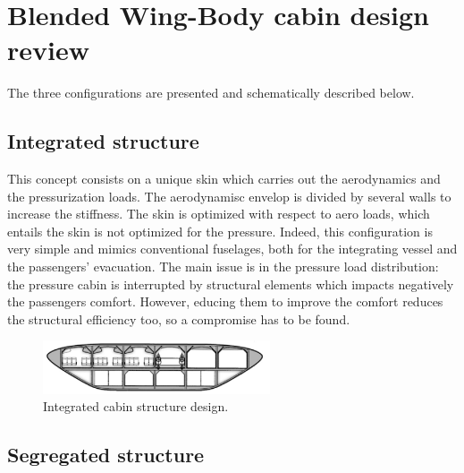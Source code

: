 \chapter{Blended Wing-Body cabin design review}
\label{app:bwb_cabin_design}

The three configurations are presented and schematically described below. 

\section{Integrated structure}
\label{sec:app1_integrated_struct}

This concept consists on a unique skin which carries out the aerodynamics and the pressurization loads. 
The aerodynamisc envelop is divided by several walls to increase the stiffness.
The skin is optimized with respect to aero loads, which entails the skin is not optimized for the pressure. 
Indeed, this configuration is very simple and mimics conventional fuselages, both for the integrating vessel and the passengers' evacuation. 
The main issue is in the pressure load distribution: the pressure cabin is interrupted by structural elements which impacts negatively the passengers comfort. 
However, educing them to improve the comfort reduces the structural efficiency too, so a compromise has to be found.
\begin{figure}[h!]
	\centering
	\includegraphics[keepaspectratio, width=0.6\textwidth]{images/app_bwb_cab/integrated_structure.jpg}
	\caption{Integrated cabin structure design.}
	\label{fig:bwb_integrated}
\end{figure}

\section{Segregated structure}
\label{sec:app1_segregated_struct}


